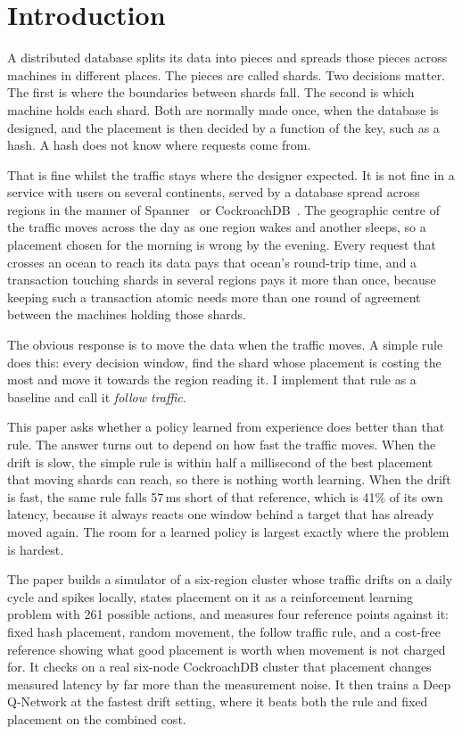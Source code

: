 \section{Introduction}

A distributed database splits its data into pieces and spreads those pieces
across machines in different places. The pieces are called shards. Two
decisions matter. The first is where the boundaries between shards fall. The
second is which machine holds each shard. Both are normally made once, when
the database is designed, and the placement is then decided by a function of
the key, such as a hash. A hash does not know where requests come from.

That is fine whilst the traffic stays where the designer expected. It is not
fine in a service with users on several continents, served by a database
spread across regions in the manner of Spanner~\cite{corbett2013spanner} or
CockroachDB~\cite{taft2020cockroachdb}. The geographic centre of the traffic
moves across the day as one region wakes and another sleeps, so a placement
chosen for the morning is wrong by the evening. Every request that crosses an
ocean to reach its data pays that ocean's round-trip time, and a transaction
touching shards in several regions pays it more than once, because keeping
such a transaction atomic needs more than one round of agreement between the
machines holding those shards.

The obvious response is to move the data when the traffic moves. A simple
rule does this: every decision window, find the shard whose placement is
costing the most and move it towards the region reading it. I implement that
rule as a baseline and call it \emph{follow traffic}.

This paper asks whether a policy learned from experience does better than
that rule. The answer turns out to depend on how fast the traffic moves. When
the drift is slow, the simple rule is within half a millisecond of the best
placement that moving shards can reach, so there is nothing worth learning.
When the drift is fast, the same rule falls 57\,ms short of that reference,
which is 41\% of its own latency, because it always reacts one window behind a
target that has already moved again. The room for a learned policy is largest
exactly where the problem is hardest.

The paper builds a simulator of a six-region cluster whose traffic drifts on
a daily cycle and spikes locally, states placement on it as a reinforcement
learning problem with 261 possible actions, and measures four reference
points against it: fixed hash placement, random movement, the follow traffic
rule, and a cost-free reference showing what good placement is worth when
movement is not charged for. It checks on a real six-node CockroachDB cluster
that placement changes measured latency by far more than the measurement
noise. It then trains a Deep Q-Network at the fastest drift setting, where it
beats both the rule and fixed placement on the combined cost.
